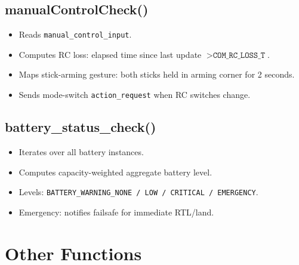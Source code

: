 \documentclass[12pt,a4paper]{article}
\begin{document}
\subsection{manualControlCheck()}
\begin{itemize}
  \item Reads \texttt{manual\_control\_input}.
  \item Computes RC loss: elapsed time since last update
        $> \texttt{COM\_RC\_LOSS\_T}$.
  \item Maps stick-arming gesture: both sticks held in arming corner for
        2 seconds.
  \item Sends mode-switch \texttt{action\_request} when RC switches change.
\end{itemize}

\subsection{battery\_status\_check()}
\begin{itemize}
  \item Iterates over all battery instances.
  \item Computes capacity-weighted aggregate battery level.
  \item Levels: \texttt{BATTERY\_WARNING\_NONE / LOW / CRITICAL / EMERGENCY}.
  \item Emergency: notifies failsafe for immediate RTL/land.
\end{itemize}

\section{Other Functions}
\end{document}

